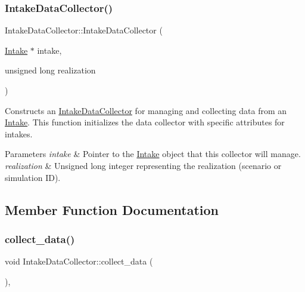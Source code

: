 \subsubsection{\texorpdfstring{Intake\+Data\+Collector()}{IntakeDataCollector()}}
{\footnotesize\ttfamily Intake\+Data\+Collector\+::\+Intake\+Data\+Collector (\begin{DoxyParamCaption}\item[{\mbox{\hyperlink{classIntake}{Intake}} $\ast$}]{intake,  }\item[{unsigned long}]{realization }\end{DoxyParamCaption})}



Constructs an \mbox{\hyperlink{classIntakeDataCollector}{Intake\+Data\+Collector}} for managing and collecting data from an \mbox{\hyperlink{classIntake}{Intake}}. This function initializes the data collector with specific attributes for intakes. 


\begin{DoxyParams}{Parameters}
{\em intake} & Pointer to the \mbox{\hyperlink{classIntake}{Intake}} object that this collector will manage. \\
\hline
{\em realization} & Unsigned long integer representing the realization (scenario or simulation ID). \\
\hline
\end{DoxyParams}


\subsection{Member Function Documentation}
\mbox{\label{classIntakeDataCollector_aed1610e5419465b35041b05b9f60c212}} 
\subsubsection{\texorpdfstring{collect\+\_\+data()}{collect\_data()}}
{\footnotesize\ttfamily void Intake\+Data\+Collector\+::collect\+\_\+data (\begin{DoxyParamCaption}{ }\end{DoxyParamCaption})\hspace{0.3cm}{\ttfamily [override]}, {\ttfamily [virtual]}}



